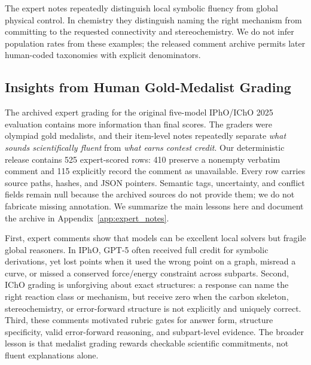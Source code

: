 \documentclass[11pt]{article}
\begin{document}
The expert notes repeatedly distinguish local symbolic fluency from global physical control. In chemistry they distinguish naming the right mechanism from committing to the requested connectivity and stereochemistry. We do not infer population rates from these examples; the released comment archive permits later human-coded taxonomies with explicit denominators.

\subsection{Insights from Human Gold-Medalist Grading}
\label{sec:expert-insights}
The archived expert grading for the original five-model IPhO/IChO 2025 evaluation contains more information than final scores.
The graders were olympiad gold medalists, and their item-level notes repeatedly separate \emph{what sounds scientifically fluent} from \emph{what earns contest credit}.
Our deterministic release contains 525 expert-scored rows: 410 preserve a nonempty verbatim comment and 115 explicitly record the comment as unavailable. Every row carries source paths, hashes, and JSON pointers. Semantic tags, uncertainty, and conflict fields remain null because the archived sources do not provide them; we do not fabricate missing annotation. We summarize the main lessons here and document the archive in Appendix~\ref{app:expert_notes}.

First, expert comments show that models can be excellent local solvers but fragile global reasoners.
In IPhO, GPT-5 often received full credit for symbolic derivations, yet lost points when it used the wrong point on a graph, misread a curve, or missed a conserved force/energy constraint across subparts.
Second, IChO grading is unforgiving about exact structures: a response can name the right reaction class or mechanism, but receive zero when the carbon skeleton, stereochemistry, or error-forward structure is not explicitly and uniquely correct.
Third, these comments motivated rubric gates for answer form, structure specificity, valid error-forward reasoning, and subpart-level evidence.
The broader lesson is that medalist grading rewards checkable scientific commitments, not fluent explanations alone.
\end{document}

